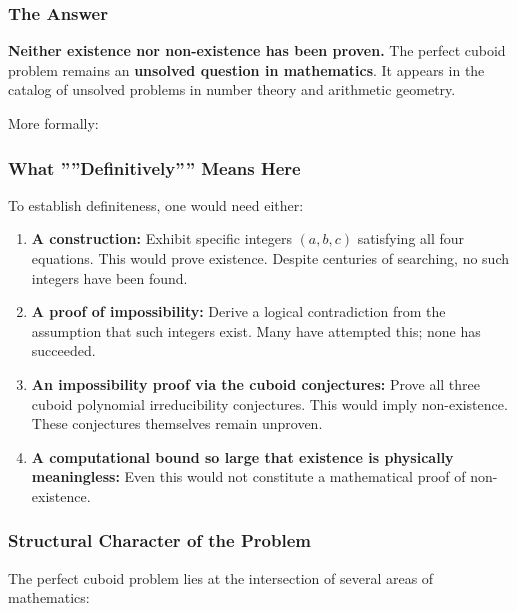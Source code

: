 \documentclass[10pt,a4paper]{article}
\begin{document}
\subsubsection{The Answer}

\textbf{Neither existence nor non-existence has been proven.} The perfect cuboid problem remains an \textbf{unsolved question in mathematics}. It appears in the catalog of unsolved problems in number theory and arithmetic geometry.

More formally:

\begin{quote}
\end{quote}

\subsubsection{What ''''Definitively'''' Means Here}

To establish definiteness, one would need either:

\begin{enumerate}
    \item \textbf{A construction:} Exhibit specific integers $(a, b, c)$ satisfying all four equations. This would prove existence. Despite centuries of searching, no such integers have been found.
    \item \textbf{A proof of impossibility:} Derive a logical contradiction from the assumption that such integers exist. Many have attempted this; none has succeeded.
    \item \textbf{An impossibility proof via the cuboid conjectures:} Prove all three cuboid polynomial irreducibility conjectures. This would imply non-existence. These conjectures themselves remain unproven.
    \item \textbf{A computational bound so large that existence is physically meaningless:} Even this would not constitute a mathematical proof of non-existence.
\end{enumerate}

\subsubsection{Structural Character of the Problem}

The perfect cuboid problem lies at the intersection of several areas of mathematics:
\end{document}
